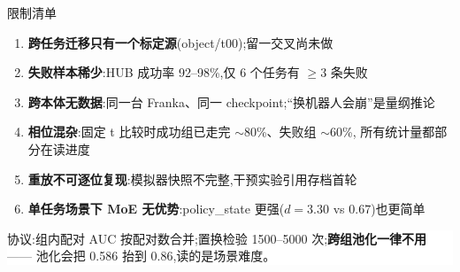 \documentclass[aspectratio=169,10pt]{beamer}
\newcommand{\dimm}[1]{{\footnotesize\color{gray2}#1}}
\begin{document}
\begin{frame}{限制清单}
  \small
  \begin{enumerate}
    \item \textbf{跨任务迁移只有一个标定源}(object/t00);留一交叉尚未做
    \item \textbf{失败样本稀少}:HUB 成功率 92--98\%,仅 6 个任务有 $\ge$3 条失败
    \item \textbf{跨本体无数据}:同一台 Franka、同一 checkpoint;“换机器人会崩”是量纲推论
    \item \textbf{相位混杂}:固定 t 比较时成功组已走完 $\sim$80\%、失败组 $\sim$60\%,
          所有统计量都部分在读进度
    \item \textbf{重放不可逐位复现}:模拟器快照不完整,干预实验引用存档首轮
    \item \textbf{单任务场景下 MoE 无优势}:policy\_state 更强($d{=}3.30$ vs $0.67$)也更简单
  \end{enumerate}
  \vfill
  \begin{center}
  \colorbox{white}{\parbox{0.86\textwidth}{\centering\vspace{2pt}
    \dimm{协议:组内配对 AUC 按配对数合并;置换检验 1500--5000 次;\textbf{跨组池化一律不用}
    —— 池化会把 0.586 抬到 0.86,读的是场景难度。}\vspace{2pt}}}
  \end{center}
\end{frame}
\end{document}
